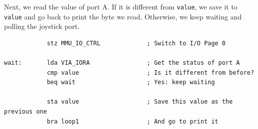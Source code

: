 Next, we read the value of port A. If it is different from \verb+value+, we save it to \verb+value+ and go back to print the byte we read. Otherwise, we keep waiting and polling the joystick port.

\begin{verbatim}
            stz MMU_IO_CTRL             ; Switch to I/O Page 0

wait:       lda VIA_IORA                ; Get the status of port A
            cmp value                   ; Is it different from before?
            beq wait                    ; Yes: keep waiting

            sta value                   ; Save this value as the previous one
            bra loop1                   ; And go to print it
\end{verbatim}
